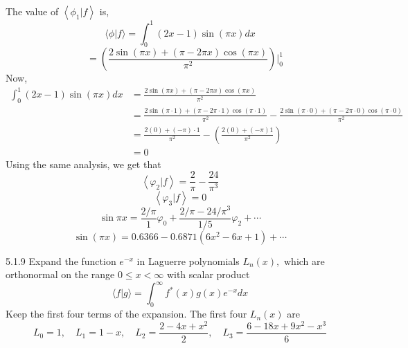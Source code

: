 The value of $\left\langle\phi_{1} | f\right\rangle$ is,
$$\langle\phi | f\rangle=\int_{0}^{1}(2 x-1) \sin (\pi x) d x$$
$$\quad=\left(\frac{2 \sin (\pi x)+(\pi-2 \pi x) \cos (\pi x)}{\pi^{2}}\right)\Bigg|_{0}^{1}$$
Now,
$$
\begin{aligned}
\int_{0}^{1}(2 x-1) \sin (\pi x) d x&=\frac{2 \sin (\pi x)+(\pi-2 \pi x) \cos (\pi x)}{\pi^{2}} \\
&=\frac{2 \sin (\pi \cdot 1)+(\pi-2 \pi \cdot 1) \cos (\pi \cdot 1)}{\pi^{2}}-\frac{2 \sin (\pi \cdot 0)+(\pi-2 \pi \cdot 0) \cos (\pi \cdot 0)}{\pi^{2}} \\
&=\frac{2(0)+(-\pi) \cdot 1}{\pi^{2}}-\left(\frac{2(0)+(-\pi) 1}{\pi^{2}}\right) \\
&=0 
\end{aligned}
$$
Using the same analysis, we get that
$$
\left\langle\varphi_{2} | f\right\rangle=\frac{2}{\pi}-\frac{24}{\pi^{3}}
$$
$$
\left\langle\varphi_{3} | f\right\rangle=0
$$
$$
\sin \pi x=\frac{2 / \pi}{1} \varphi_{0}+\frac{2 / \pi-24 / \pi^{3}}{1 / 5} \varphi_{2}+\cdots
$$
$$\sin(\pi x) =0.6366-0.6871\left(6 x^{2}-6 x+1\right)+\cdots $$

\newpage

\begin{mybox}{5.1.9}
Expand the function $e^{-x}$ in Laguerre polynomials $L_{n}(x),$ which are orthonormal on the range $0 \leq x<\infty$ with scalar product
$$
\langle f | g\rangle=\int_{0}^{\infty} f^{*}(x) g(x) e^{-x} d x
$$
Keep the first four terms of the expansion. The first four $L_{n}(x)$ are
$$
L_{0}=1, \quad L_{1}=1-x, \quad L_{2}=\frac{2-4 x+x^{2}}{2}, \quad L_{3}=\frac{6-18 x+9 x^{2}-x^{3}}{6}
$$
\end{mybox}

